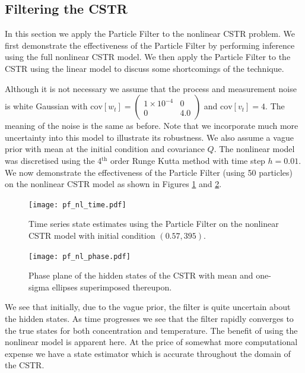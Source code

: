 \documentclass[../masters.tex]{subfiles}
\begin{document}
\subsection{Filtering the CSTR}
In this section we apply the Particle Filter to the nonlinear CSTR problem. We first demonstrate the effectiveness of the Particle Filter by performing inference using the full nonlinear CSTR model. We then apply the Particle Filter to the CSTR using the linear model to discuss some shortcomings of the technique.

Although it is not necessary we assume that the process and measurement noise is white Gaussian with $\text{cov}[w_t] = \begin{pmatrix}
1\times 10^{-4} & 0 \\ 0 & 4.0 
\end{pmatrix}$ and $\text{cov}[v_t] = 4$. The meaning of the noise is the same as before. Note that we incorporate much more uncertainty into this model to illustrate its robustness. We also assume a vague prior with mean at the initial condition and covariance $Q$. The nonlinear model was discretised using the 4$^{\text{th}}$ order Runge Kutta method \cite{edwardsandpenny} with time step $h=0.01$. We now demonstrate the effectiveness of the Particle Filter (using 50 particles) on the nonlinear CSTR model as shown in Figures \ref{fig_pfnltime} and \ref{fig_pfnlphase}.
\begin{figure}[H] 
\centering
\texttt{[image: pf\_nl\_time.pdf]}
\caption{Time series state estimates using the Particle Filter on the nonlinear CSTR model with initial condition $(0.57, 395)$.}
\label{fig_pfnltime}
\end{figure}
\begin{figure}[H] 
\centering
\texttt{[image: pf\_nl\_phase.pdf]}
\caption{Phase plane of the hidden states of the CSTR with mean and one-sigma ellipses superimposed thereupon.}
\label{fig_pfnlphase}
\end{figure}
We see that initially, due to the vague prior, the filter is quite uncertain about the hidden states. As time progresses we see that the filter rapidly converges to the true states for both concentration and temperature. The benefit of using the nonlinear model is apparent here. At the price of somewhat more computational expense we have a state estimator which is accurate throughout the domain of the CSTR.
\end{document}
